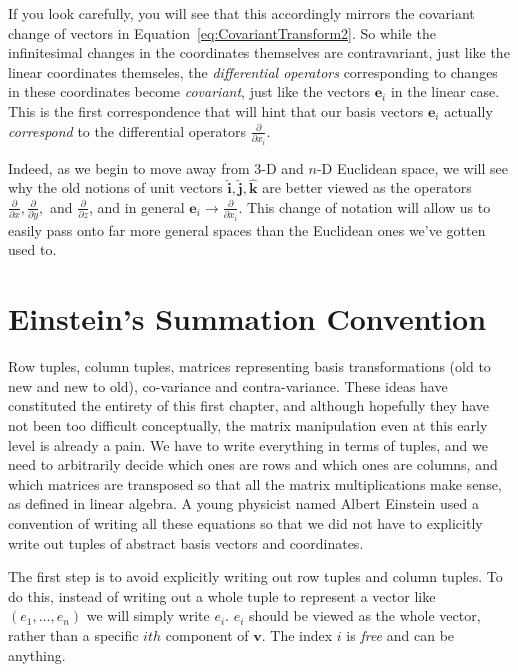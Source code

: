 \documentclass[../master.tex]{subfiles}
\begin{document}
	If you look carefully, you will see that this accordingly mirrors the covariant change of vectors in Equation~\eqref{eq:CovariantTransform2}. So while the infinitesimal changes in the coordinates themselves are contravariant, just like the linear coordinates themseles, the \emph{differential operators} corresponding to changes in these coordinates become \emph{covariant}, just like the vectors $\mathbf e_i$ in the linear case. This is the first correspondence that will hint that our basis vectors $\mathbf e_i$ actually \emph{correspond} to the differential operators $\frac{\partial}{\partial x_i}$.
	
	Indeed, as we begin to move away from 3-D and $n$-D Euclidean space, we will see why the old notions of unit vectors $\mathbf{\hat i}, \mathbf{\hat j}, \mathbf{\hat k}$ are better viewed as the operators $\frac{\partial}{\partial x}, \frac{\partial}{\partial y},$ and $ \frac{\partial}{\partial z}$, and in general $\mathbf e_i \rightarrow \frac{\partial}{\partial x_i}$. This change of notation will allow us to easily pass onto far more general spaces than the Euclidean ones we've gotten used to. 
	
	
	\section{Einstein's Summation Convention} %
	\label{sec:einstein's_summation_convention}
	
	Row tuples, column tuples, matrices representing basis transformations (old to new and new to old), co-variance and contra-variance. These ideas have constituted the entirety of this first chapter, and although hopefully they have not been too difficult conceptually, the matrix manipulation even at this early level is already a pain. We have to write everything in terms of tuples, and we need to arbitrarily decide which ones are rows and which ones are columns, and which matrices are transposed so that all the matrix multiplications make sense, as defined in linear algebra. A young physicist named Albert Einstein used a convention of writing all these equations so that we did not have to explicitly write out tuples of abstract basis vectors and coordinates.
	
	The first step is to avoid explicitly writing out row tuples and column tuples. To do this, instead of writing out a whole tuple to represent a vector like $(e_1, \dots, e_n)$ we will simply write $e_i$. $e_i$ should be viewed as the whole vector, rather than a specific $ith$ component of $\mathbf v$. The index $i$ is \emph{free} and can be anything. 
	
\end{document}

